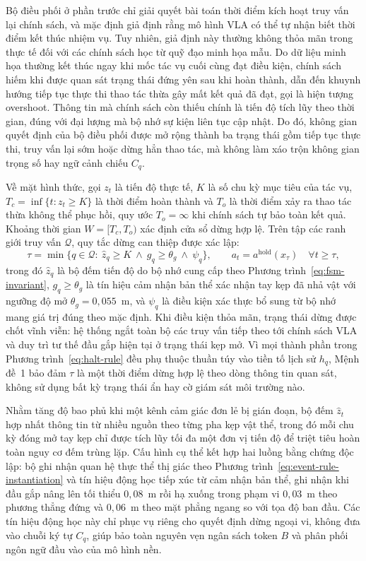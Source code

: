 Bộ điều phối ở phần trước chỉ giải quyết bài toán thời điểm kích hoạt truy vấn lại chính sách, và mặc định giả định rằng mô hình VLA có thể tự nhận biết thời điểm kết thúc nhiệm vụ. Tuy nhiên, giả định này thường không thỏa mãn trong thực tế đối với các chính sách học từ quỹ đạo minh họa mẫu. Do dữ liệu minh họa thường kết thúc ngay khi mốc tác vụ cuối cùng đạt điều kiện, chính sách hiếm khi được quan sát trạng thái đứng yên sau khi hoàn thành, dẫn đến khuynh hướng tiếp tục thực thi thao tác thừa gây mất kết quả đã đạt, gọi là hiện tượng overshoot. Thông tin mà chính sách còn thiếu chính là tiến độ tích lũy theo thời gian, đúng với đại lượng mà bộ nhớ sự kiện liên tục cập nhật. Do đó, không gian quyết định của bộ điều phối được mở rộng thành ba trạng thái gồm tiếp tục thực thi, truy vấn lại sớm hoặc dừng hẳn thao tác, mà không làm xáo trộn không gian trọng số hay ngữ cảnh chiếu $C_q$.

Về mặt hình thức, gọi $z_t$ là tiến độ thực tế, $K$ là số chu kỳ mục tiêu của tác vụ, $T_c = \inf\{t: z_t \ge K\}$ là thời điểm hoàn thành và $T_o$ là thời điểm xảy ra thao tác thừa không thể phục hồi, quy ước $T_o = \infty$ khi chính sách tự bảo toàn kết quả. Khoảng thời gian $W = [T_c, T_o)$ xác định cửa sổ dừng hợp lệ. Trên tập các ranh giới truy vấn $\mathcal Q$, quy tắc dừng can thiệp được xác lập:
\begin{equation}
\tau = \min\{q \in \mathcal Q:\ \hat z_q \ge K\ \land\ g_q \ge \theta_g\ \land\ \psi_q\},\qquad a_t = a^{\mathrm{hold}}(x_\tau)\quad \forall t \ge \tau,
\label{eq:halt-rule}
\end{equation}
trong đó $\hat z_q$ là bộ đếm tiến độ do bộ nhớ cung cấp theo Phương trình~\eqref{eq:fsm-invariant}, $g_q \ge \theta_g$ là tín hiệu cảm nhận bản thể xác nhận tay kẹp đã nhả vật với ngưỡng độ mở $\theta_g = 0{,}055$~m, và $\psi_q$ là điều kiện xác thực bổ sung từ bộ nhớ mang giá trị đúng theo mặc định. Khi điều kiện thỏa mãn, trạng thái dừng được chốt vĩnh viễn: hệ thống ngắt toàn bộ các truy vấn tiếp theo tới chính sách VLA và duy trì tư thế đầu gắp hiện tại ở trạng thái kẹp mở. Vì mọi thành phần trong Phương trình~\eqref{eq:halt-rule} đều phụ thuộc thuần túy vào tiền tố lịch sử $h_q$, Mệnh đề~1 bảo đảm $\tau$ là một thời điểm dừng hợp lệ theo dòng thông tin quan sát, không sử dụng bất kỳ trạng thái ẩn hay cờ giám sát môi trường nào.

Nhằm tăng độ bao phủ khi một kênh cảm giác đơn lẻ bị gián đoạn, bộ đếm $\hat z_t$ hợp nhất thông tin từ nhiều nguồn theo từng pha kẹp vật thể, trong đó mỗi chu kỳ đóng mở tay kẹp chỉ được tích lũy tối đa một đơn vị tiến độ để triệt tiêu hoàn toàn nguy cơ đếm trùng lặp. Cấu hình cụ thể kết hợp hai luồng bằng chứng độc lập: bộ ghi nhận quan hệ thực thể thị giác theo Phương trình~\eqref{eq:event-rule-instantiation} và tín hiệu động học tiếp xúc từ cảm nhận bản thể, ghi nhận khi đầu gắp nâng lên tối thiểu $0{,}08$~m rồi hạ xuống trong phạm vi $0{,}03$~m theo phương thẳng đứng và $0{,}06$~m theo mặt phẳng ngang so với tọa độ ban đầu. Các tín hiệu động học này chỉ phục vụ riêng cho quyết định dừng ngoại vi, không đưa vào chuỗi ký tự $C_q$, giúp bảo toàn nguyên vẹn ngân sách token $B$ và phân phối ngôn ngữ đầu vào của mô hình nền.


